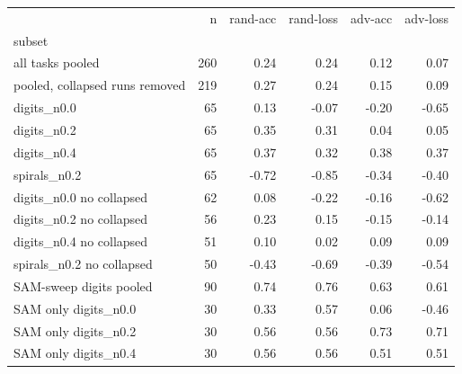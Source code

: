 \begin{tabular}{lrrrrr}
\toprule
 & n & rand-acc & rand-loss & adv-acc & adv-loss \\
subset &  &  &  &  &  \\
\midrule
all tasks pooled & 260 & 0.24 & 0.24 & 0.12 & 0.07 \\
pooled, collapsed runs removed & 219 & 0.27 & 0.24 & 0.15 & 0.09 \\
digits\_n0.0 & 65 & 0.13 & -0.07 & -0.20 & -0.65 \\
digits\_n0.2 & 65 & 0.35 & 0.31 & 0.04 & 0.05 \\
digits\_n0.4 & 65 & 0.37 & 0.32 & 0.38 & 0.37 \\
spirals\_n0.2 & 65 & -0.72 & -0.85 & -0.34 & -0.40 \\
digits\_n0.0 no collapsed & 62 & 0.08 & -0.22 & -0.16 & -0.62 \\
digits\_n0.2 no collapsed & 56 & 0.23 & 0.15 & -0.15 & -0.14 \\
digits\_n0.4 no collapsed & 51 & 0.10 & 0.02 & 0.09 & 0.09 \\
spirals\_n0.2 no collapsed & 50 & -0.43 & -0.69 & -0.39 & -0.54 \\
SAM-sweep digits pooled & 90 & 0.74 & 0.76 & 0.63 & 0.61 \\
SAM only digits\_n0.0 & 30 & 0.33 & 0.57 & 0.06 & -0.46 \\
SAM only digits\_n0.2 & 30 & 0.56 & 0.56 & 0.73 & 0.71 \\
SAM only digits\_n0.4 & 30 & 0.56 & 0.56 & 0.51 & 0.51 \\
\bottomrule
\end{tabular}
